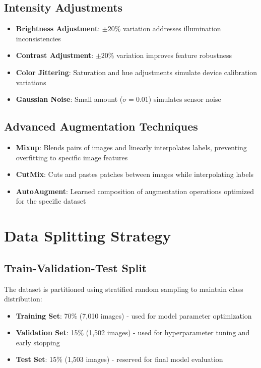 \subsection{Intensity Adjustments}

\begin{itemize}
    \item \textbf{Brightness Adjustment}: $\pm 20\%$ variation addresses illumination inconsistencies
    \item \textbf{Contrast Adjustment}: $\pm 20\%$ variation improves feature robustness
    \item \textbf{Color Jittering}: Saturation and hue adjustments simulate device calibration variations
    \item \textbf{Gaussian Noise}: Small amount ($\sigma = 0.01$) simulates sensor noise
\end{itemize}

\subsection{Advanced Augmentation Techniques}

\begin{itemize}
    \item \textbf{Mixup}: Blends pairs of images and linearly interpolates labels, preventing overfitting to specific image features
    \item \textbf{CutMix}: Cuts and pastes patches between images while interpolating labels
    \item \textbf{AutoAugment}: Learned composition of augmentation operations optimized for the specific dataset
\end{itemize}

\section{Data Splitting Strategy}

\subsection{Train-Validation-Test Split}

The dataset is partitioned using stratified random sampling to maintain class distribution:

\begin{itemize}
    \item \textbf{Training Set}: 70\% (7,010 images) - used for model parameter optimization
    \item \textbf{Validation Set}: 15\% (1,502 images) - used for hyperparameter tuning and early stopping
    \item \textbf{Test Set}: 15\% (1,503 images) - reserved for final model evaluation
\end{itemize}

